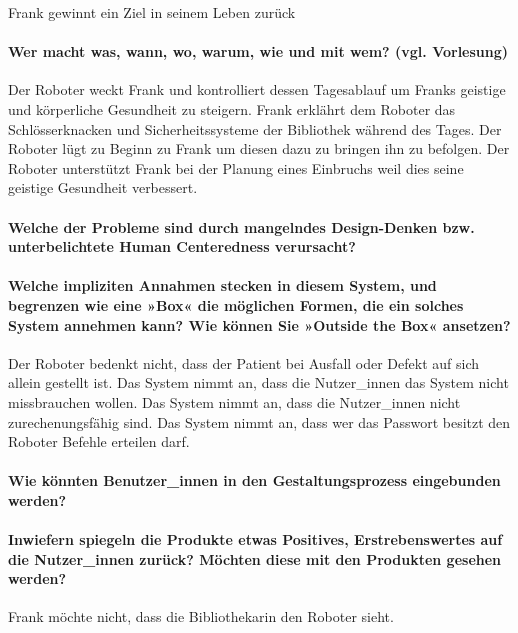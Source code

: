\documentclass[sigchi-a, authorversion]{acmart}
\begin{document}
Frank gewinnt ein Ziel in seinem Leben zurück

\paragraph{Wer macht was, wann, wo, warum, wie und mit wem? (vgl. Vorlesung)}

Der Roboter weckt Frank und kontrolliert dessen Tagesablauf um Franks geistige und körperliche Gesundheit zu steigern.
Frank erklährt dem Roboter das Schlösserknacken und Sicherheitssysteme der Bibliothek während des Tages.
Der Roboter lügt zu Beginn zu Frank um diesen dazu zu bringen ihn zu befolgen.
Der Roboter unterstützt Frank bei der Planung eines Einbruchs weil dies seine geistige Gesundheit verbessert.

\paragraph{Welche der Probleme sind durch mangelndes Design-Denken bzw. unterbelichtete Human Centeredness
verursacht?}

\paragraph
{Welche impliziten Annahmen stecken in diesem System, und begrenzen wie eine »Box« die möglichen Formen, die ein solches System annehmen kann? Wie können Sie »Outside the Box« ansetzen?}

Der Roboter bedenkt nicht, dass der Patient bei Ausfall oder Defekt auf sich allein gestellt ist.
Das System nimmt an, dass die Nutzer\_innen das System nicht missbrauchen wollen.
Das System nimmt an, dass die Nutzer\_innen nicht zurechenungsfähig sind.
Das System nimmt an, dass wer das Passwort besitzt den Roboter Befehle erteilen darf.

\paragraph{Wie könnten Benutzer\_innen in den Gestaltungsprozess eingebunden werden?}
\paragraph
{Inwiefern spiegeln die Produkte etwas Positives, Erstrebenswertes auf die Nutzer\_innen zurück? Möchten diese mit den Produkten gesehen werden?}

Frank möchte nicht, dass die Bibliothekarin den Roboter sieht.
\end{document}
